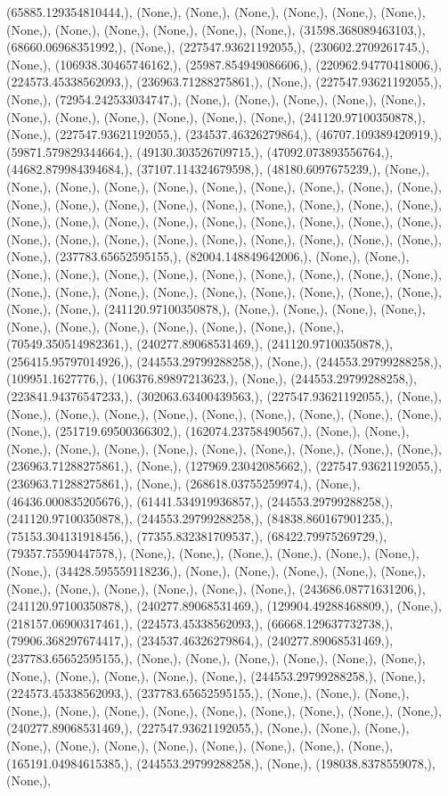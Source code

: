 \documentclass{article}
\begin{document}
(65885.129354810444,), (None,), (None,), (None,), (None,), (None,), (None,), (None,), (None,), (None,), (None,), (None,), (None,), (31598.368089463103,), (68660.06968351992,), (None,), (227547.93621192055,), (230602.2709261745,), (None,), (106938.30465746162,), (25987.854949086606,), (220962.94770418006,), (224573.45338562093,), (236963.71288275861,), (None,), (227547.93621192055,), (None,), (72954.242533034747,), (None,), (None,), (None,), (None,), (None,), (None,), (None,), (None,), (None,), (None,), (None,), (241120.97100350878,), (None,), (227547.93621192055,), (234537.46326279864,), (46707.109389420919,), (59871.579829344664,), (49130.303526709715,), (47092.073893556764,), (44682.879984394684,), (37107.114324679598,), (48180.6097675239,), (None,), (None,), (None,), (None,), (None,), (None,), (None,), (None,), (None,), (None,), (None,), (None,), (None,), (None,), (None,), (None,), (None,), (None,), (None,), (None,), (None,), (None,), (None,), (None,), (None,), (None,), (None,), (None,), (None,), (None,), (None,), (None,), (None,), (None,), (None,), (None,), (None,), (None,), (237783.65652595155,), (82004.148849642006,), (None,), (None,), (None,), (None,), (None,), (None,), (None,), (None,), (None,), (None,), (None,), (None,), (None,), (None,), (None,), (None,), (None,), (None,), (None,), (None,), (None,), (None,), (241120.97100350878,), (None,), (None,), (None,), (None,), (None,), (None,), (None,), (None,), (None,), (None,), (None,), (70549.350514982361,), (240277.89068531469,), (241120.97100350878,), (256415.95797014926,), (244553.29799288258,), (None,), (244553.29799288258,), (109951.1627776,), (106376.89897213623,), (None,), (244553.29799288258,), (223841.94376547233,), (302063.63400439563,), (227547.93621192055,), (None,), (None,), (None,), (None,), (None,), (None,), (None,), (None,), (None,), (None,), (None,), (251719.69500366302,), (162074.23758490567,), (None,), (None,), (None,), (None,), (None,), (None,), (None,), (None,), (None,), (None,), (None,), (236963.71288275861,), (None,), (127969.23042085662,), (227547.93621192055,), (236963.71288275861,), (None,), (268618.03755259974,), (None,), (46436.000835205676,), (61441.534919936857,), (244553.29799288258,), (241120.97100350878,), (244553.29799288258,), (84838.860167901235,), (75153.304131918456,), (77355.832381709537,), (68422.79975269729,), (79357.75590447578,), (None,), (None,), (None,), (None,), (None,), (None,), (None,), (34428.595559118236,), (None,), (None,), (None,), (None,), (None,), (None,), (None,), (None,), (None,), (None,), (None,), (243686.08771631206,), (241120.97100350878,), (240277.89068531469,), (129904.49288468809,), (None,), (218157.06900317461,), (224573.45338562093,), (66668.129637732738,), (79906.368297674417,), (234537.46326279864,), (240277.89068531469,), (237783.65652595155,), (None,), (None,), (None,), (None,), (None,), (None,), (None,), (None,), (None,), (None,), (None,), (244553.29799288258,), (None,), (224573.45338562093,), (237783.65652595155,), (None,), (None,), (None,), (None,), (None,), (None,), (None,), (None,), (None,), (None,), (None,), (None,), (240277.89068531469,), (227547.93621192055,), (None,), (None,), (None,), (None,), (None,), (None,), (None,), (None,), (None,), (None,), (None,), (165191.04984615385,), (244553.29799288258,), (None,), (198038.8378559078,), (None,), 
\end{document}
